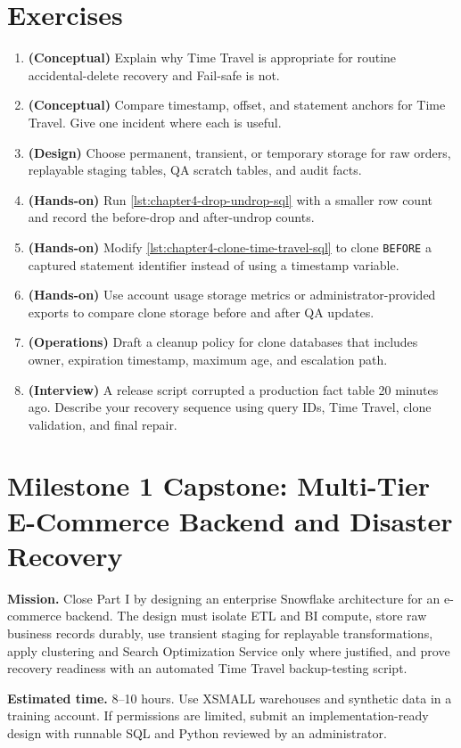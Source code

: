 \section{Exercises}
\begin{enumerate}
    \item \textbf{(Conceptual)} Explain why Time Travel is appropriate for routine accidental-delete recovery and Fail-safe is not.
    \item \textbf{(Conceptual)} Compare timestamp, offset, and statement anchors for Time Travel. Give one incident where each is useful.
    \item \textbf{(Design)} Choose permanent, transient, or temporary storage for raw orders, replayable staging tables, QA scratch tables, and audit facts.
    \item \textbf{(Hands-on)} Run \cref{lst:chapter4-drop-undrop-sql} with a smaller row count and record the before-drop and after-undrop counts.
    \item \textbf{(Hands-on)} Modify \cref{lst:chapter4-clone-time-travel-sql} to clone \texttt{BEFORE} a captured statement identifier instead of using a timestamp variable.
    \item \textbf{(Hands-on)} Use account usage storage metrics or administrator-provided exports to compare clone storage before and after QA updates.
    \item \textbf{(Operations)} Draft a cleanup policy for clone databases that includes owner, expiration timestamp, maximum age, and escalation path.
    \item \textbf{(Interview)} A release script corrupted a production fact table 20 minutes ago. Describe your recovery sequence using query IDs, Time Travel, clone validation, and final repair.
\end{enumerate}
\section{Milestone 1 Capstone: Multi-Tier E-Commerce Backend and Disaster Recovery}\label{sec:ch4-capstone}
\begin{capstonebox}
\textbf{Mission.} Close Part I by designing an enterprise Snowflake architecture for an e-commerce backend. The design must isolate ETL and BI compute, store raw business records durably, use transient staging for replayable transformations, apply clustering and Search Optimization Service only where justified, and prove recovery readiness with an automated Time Travel backup-testing script.\par
\textbf{Estimated time.} 8--10 hours. Use XSMALL warehouses and synthetic data in a training account. If permissions are limited, submit an implementation-ready design with runnable SQL and Python reviewed by an administrator.
\end{capstonebox}
